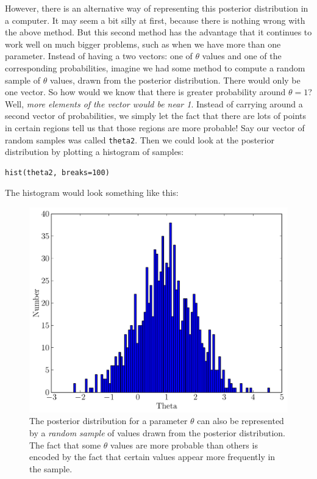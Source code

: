 However,
there is an alternative way of representing this posterior distribution in a
computer. It may seem a bit silly at first, because there is nothing wrong with
the above method. But this second method has the advantage that it continues to
work well on much bigger problems, such as when we have more than one parameter.
Instead of having a two vectors: one of $\theta$ values and one of the
corresponding probabilities,
imagine we had some method to compute a random sample of $\theta$ values, drawn
from the posterior distribution. There would only be one vector. So how would we
know that there is greater probability around $\theta=1$? Well, {\it more elements
of the vector would be near 1}. Instead of carrying around a second vector of
probabilities, we simply let the fact that there are lots of points in certain
regions tell us that those regions are more probable! Say our vector of random
samples was called {\tt theta2}. Then we could look at the posterior distribution
by plotting a histogram of samples:
\begin{verbatim}
hist(theta2, breaks=100)
\end{verbatim}
The histogram would look something like this:
\begin{figure}[ht!]
\begin{center}
\includegraphics[scale=0.5]{Figures/normal2.pdf}
\caption{The posterior distribution for a parameter $\theta$ can also be
represented by a {\it random sample} of values drawn from the posterior
distribution. The fact that some $\theta$ values are more probable than others
is encoded by the fact that certain values appear more frequently in the sample.
\label{fig:normal2}}
\end{center}
\end{figure}
